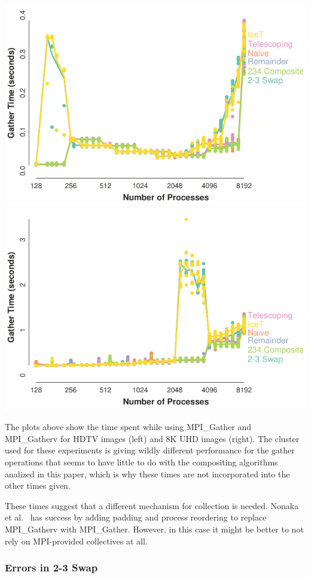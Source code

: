 \documentclass{vgtc}                          %
\newcommand*{\scite}[1]{~\cite{#1}}
\newcommand{\etal}{et al.\xspace}
\begin{document}
\noindent
\includegraphics[width=.5\linewidth]{gather-hdtv}%
\includegraphics[width=.5\linewidth]{gather-8k}

The plots above show the time spent while using MPI\_Gather and MPI\_Gatherv for HDTV images (left) and 8K UHD images (right).
The cluster used for these experiments is giving wildly different performance for the gather operations that seems to have little to do with the compositing algorithms analized in this paper, which is why these times are not incorporated into the other times given.

These times suggest that a different mechanism for collection is needed.
Nonaka \etal\scite{Nonaka2018} has success by adding padding and process reordering to replace MPI\_Gatherv with MPI\_Gather.
However, in this case it might be better to not rely on MPI-provided collectives at all.

\subsubsection{Errors in 2-3 Swap}
\label{sec:2-3SwapErrors}
\end{document}
